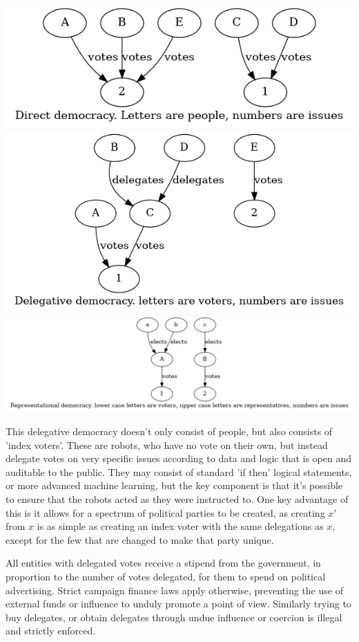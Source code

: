 \documentclass[10pt]{article}
\begin{document}
\includegraphics[width=1\textwidth]{fig_direct_democracy.png}
\includegraphics[width=1\textwidth]{fig_del_democracy.png}
\includegraphics[width=1\textwidth]{fig_rep_democracy.png}

This delegative democracy doesn't only consist of people, but also consists of 'index voters'. These are robots, who have no vote on their own, but instead delegate votes on very specific issues according to data and logic that is open and auditable to the public. They may consist of standard 'if then' logical statements, or more advanced machine learning, but the key component is that it's possible to ensure that the robots acted as they were instructed to. One key advantage of this is it allows for a spectrum of political parties to be created, as creating $x'$ from $x$ is as simple as creating an index voter with the same delegations as $x$, except for the few that are changed to make that party unique. 

All entities with delegated votes receive a stipend from the government, in proportion to the number of votes delegated, for them to spend on political advertising. Strict campaign finance laws apply otherwise, preventing the use of external funds or influence to unduly promote a point of view. Similarly trying to buy delegates, or obtain delegates through undue influence or coercion is illegal and strictly enforced.
\end{document}
